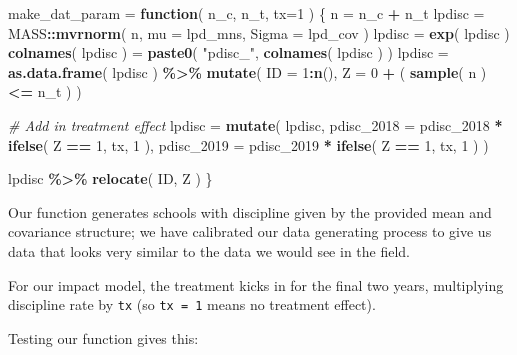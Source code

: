 \documentclass[
]{book}
\newenvironment{Shaded}{\begin{snugshade}}{\end{snugshade}}
\newcommand{\AttributeTok}[1]{\textcolor[rgb]{0.13,0.29,0.53}{#1}}
\newcommand{\CommentTok}[1]{\textcolor[rgb]{0.56,0.35,0.01}{\textit{#1}}}
\newcommand{\ControlFlowTok}[1]{\textcolor[rgb]{0.13,0.29,0.53}{\textbf{#1}}}
\newcommand{\DecValTok}[1]{\textcolor[rgb]{0.00,0.00,0.81}{#1}}
\newcommand{\FunctionTok}[1]{\textcolor[rgb]{0.13,0.29,0.53}{\textbf{#1}}}
\newcommand{\NormalTok}[1]{#1}
\newcommand{\OtherTok}[1]{\textcolor[rgb]{0.56,0.35,0.01}{#1}}
\newcommand{\SpecialCharTok}[1]{\textcolor[rgb]{0.81,0.36,0.00}{\textbf{#1}}}
\newcommand{\StringTok}[1]{\textcolor[rgb]{0.31,0.60,0.02}{#1}}
\begin{document}
\begin{Shaded}
\begin{Highlighting}[]
\NormalTok{make\_dat\_param }\OtherTok{=} \ControlFlowTok{function}\NormalTok{( n\_c, n\_t, }\AttributeTok{tx=}\DecValTok{1}\NormalTok{ ) \{}
\NormalTok{    n }\OtherTok{=}\NormalTok{ n\_c }\SpecialCharTok{+}\NormalTok{ n\_t}
\NormalTok{    lpdisc }\OtherTok{=}\NormalTok{ MASS}\SpecialCharTok{::}\FunctionTok{mvrnorm}\NormalTok{( n, }\AttributeTok{mu =}\NormalTok{ lpd\_mns, }\AttributeTok{Sigma =}\NormalTok{ lpd\_cov )}
\NormalTok{    lpdisc }\OtherTok{=} \FunctionTok{exp}\NormalTok{( lpdisc )}
    \FunctionTok{colnames}\NormalTok{( lpdisc ) }\OtherTok{=} \FunctionTok{paste0}\NormalTok{( }\StringTok{"pdisc\_"}\NormalTok{, }\FunctionTok{colnames}\NormalTok{( lpdisc ) )}
\NormalTok{    lpdisc }\OtherTok{=} \FunctionTok{as.data.frame}\NormalTok{( lpdisc ) }\SpecialCharTok{\%\textgreater{}\%}
        \FunctionTok{mutate}\NormalTok{( }\AttributeTok{ID =} \DecValTok{1}\SpecialCharTok{:}\FunctionTok{n}\NormalTok{(),}
                \AttributeTok{Z =} \DecValTok{0} \SpecialCharTok{+}\NormalTok{ ( }\FunctionTok{sample}\NormalTok{( n ) }\SpecialCharTok{\textless{}=}\NormalTok{ n\_t ) )}
    
    \CommentTok{\# Add in treatment effect}
\NormalTok{    lpdisc }\OtherTok{=} \FunctionTok{mutate}\NormalTok{( lpdisc, }
                     \AttributeTok{pdisc\_2018 =}\NormalTok{ pdisc\_2018 }\SpecialCharTok{*} \FunctionTok{ifelse}\NormalTok{( Z }\SpecialCharTok{==} \DecValTok{1}\NormalTok{, tx, }\DecValTok{1}\NormalTok{ ),}
                     \AttributeTok{pdisc\_2019 =}\NormalTok{ pdisc\_2019 }\SpecialCharTok{*} \FunctionTok{ifelse}\NormalTok{( Z }\SpecialCharTok{==} \DecValTok{1}\NormalTok{, tx, }\DecValTok{1}\NormalTok{ ) )}
 
\NormalTok{    lpdisc }\SpecialCharTok{\%\textgreater{}\%} 
      \FunctionTok{relocate}\NormalTok{( ID, Z )}
\NormalTok{\}}
\end{Highlighting}
\end{Shaded}

Our function generates schools with discipline given by the provided mean and covariance structure; we have calibrated our data generating process to give us data that looks very similar to the data we would see in the field.

For our impact model, the treatment kicks in for the final two years, multiplying discipline rate by \texttt{tx} (so \texttt{tx\ =\ 1} means no treatment effect).

Testing our function gives this:
\end{document}

